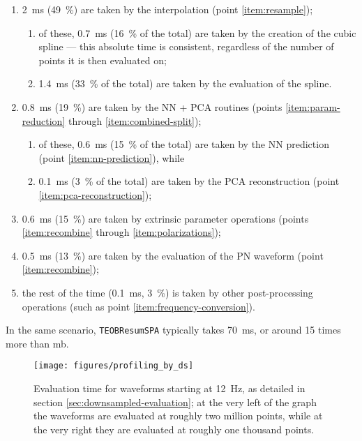 \documentclass[main.tex]{subfiles}
\begin{document}
\begin{enumerate}
    \item \SI{2}{ms} (\SI{49}{\%}) are taken by the interpolation (point \ref{item:resample});
    \begin{enumerate}
        \item of these, \SI{0.7}{ms} (\SI{16}{\%} of the total) are taken by the creation of the cubic spline --- this absolute time is consistent, regardless of the number of points it is then evaluated on; 
        \item \SI{1.4}{ms} (\SI{33}{\%} of the total) are taken by the evaluation of the spline.
    \end{enumerate}
    \item \SI{0.8}{ms} (\SI{19}{\%}) are taken by the \ac{NN} + \ac{PCA} routines (points \ref{item:param-reduction} through \ref{item:combined-split});
    \begin{enumerate}
        \item of these, \SI{0.6}{ms} (\SI{15}{\%} of the total) are taken by the \ac{NN} prediction (point \ref{item:nn-prediction}), while
        \item \SI{0.1}{ms} (\SI{3}{\%} of the total) are taken by the \ac{PCA} reconstruction (point \ref{item:pca-reconstruction});
    \end{enumerate}
    \item \SI{0.6}{ms} (\SI{15}{\%}) are taken by extrinsic parameter operations (points \ref{item:recombine} through \ref{item:polarizations});
    \item \SI{0.5}{ms} (\SI{13}{\%}) are taken by the evaluation of the \ac{PN} waveform (point \ref{item:recombine});
    \item the rest of the time (\SI{0.1}{ms}, \SI{3}{\%}) is taken by other post-processing operations (such as point \ref{item:frequency-conversion}).
\end{enumerate}

In the same scenario, \texttt{TEOBResumSPA} typically takes \SI{70}{ms}, or around 15 times more than \ac{mb}. 

\begin{figure}[ht]
\centering
\texttt{[image: figures/profiling\_by\_ds]}
\caption{Evaluation time for waveforms starting at \SI{12}{Hz}, as detailed in section \ref{sec:downsampled-evaluation}; at the very left of the graph the waveforms are evaluated at roughly two million points, while at the very right they are evaluated at roughly one thousand points.}
\label{fig:profiling_by_ds}
\end{figure}
\end{document}
